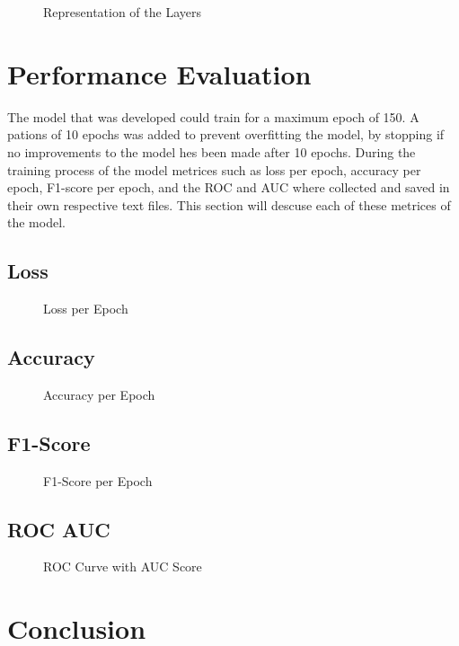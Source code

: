 \documentclass[a4paper,oneside,11pt]{book}
\begin{document}
\begin{figure}[h]
    \centering
    \caption{Representation of the Layers}
\end{figure}

\chapter[Performance Evaluation]{Performance Evaluation}

The model that was developed could train for a maximum epoch of 150. A pations of 10 epochs was added to prevent overfitting the model, by stopping if no improvements to the model hes been made after 10 epochs. During the training process of the model metrices such as loss per epoch, accuracy per epoch, F1-score per epoch, and the ROC and AUC where collected and saved in their own respective text files. This section will descuse each of these metrices of the model.

\section{Loss}

\begin{figure}[h]
    \centering
    \caption{Loss per Epoch}
\end{figure}

\section{Accuracy}

\begin{figure}[h]
    \centering
    \caption{Accuracy per Epoch}
\end{figure}

\section{F1-Score}

\begin{figure}[h]
    \centering
    \caption{F1-Score per Epoch}
\end{figure}

\section{ROC AUC}

\begin{figure}[h]
    \centering
    \caption{ROC Curve with AUC Score}
\end{figure}

\chapter[Conclusion]{Conclusion}


\end{document}

